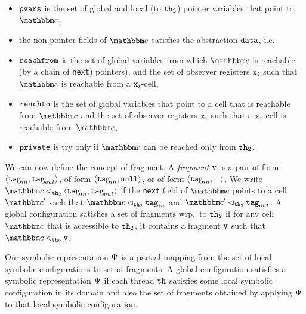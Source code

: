 \begin{itemize}
\item
  $\mathtt{pvars}$ is the set of global and local (to ${\tt th}_2$)
  pointer variables that point to $\cell$,
\item
the non-pointer fields of $\cell$ satisfies the abstraction $\mathtt{data}$, i.e.
\item $\mathtt{reachfrom}$ is the set of global variables from which $\cell$ is 
  reachable (by a chain of {\tt next}) pointers), and the set of
  observer registers $\mathtt{x}_i$ such that $\cell$ is reachable from a $\mathtt{x}_i$-cell,
\item $\mathtt{reachto}$ is the set of global variables that point to a cell that
  is reachable from $\cell$ and  the set of
  observer registers $\mathtt{x}_i$ such that a $\mathtt{x}_i$-cell is reachable from $\cell$,
\item $\mathtt{private}$ is try only if $\cell$ can be reached only from ${\tt th}_2$.
\end{itemize}

We can now define the concept of fragment.
A {\em fragment} $\mathtt{v}$ is a pair of form $\left\langle\mathtt{tag}_{in},\mathtt{tag}_{out}\right\rangle$, 
of form $\left\langle\mathtt{tag}_{in},{\tt null}\right\rangle$, or 
of form $\left\langle\mathtt{tag}_{in},\bot\right\rangle$.
We write  
$\cell \satfrag{{\thread_2}} \tuple{\inputtag,\outputtag}$ if
the {\tt next} field of $\cell$ points to a cell $\cell'$ such that
$\cell \satfrag{{\thread_2}} \inputtag$ and
$\cell' \satfrag{{\thread_2}} \outputtag$.
A global configuration satisfies a set of fragments wrp.\ to ${\tt th}_2$ if
for any cell $\cell$ that is accessible to ${\tt th}_2$, it contains a fragment
$\mathtt{v}$ such that $\cell \satfrag{{\thread_2}} \frag$.

Our symbolic representation $\Psi$ is a partial mapping from the set of
local symbolic configurations to set of fragments. A global configuration
satisfies a symbolic representation $\Psi$ if each thread ${\tt th}$
satisfies some local symbolic
configuration in its domain and also the set of fragments
obtained by applying $\Psi$ to that local symbolic configuration.


